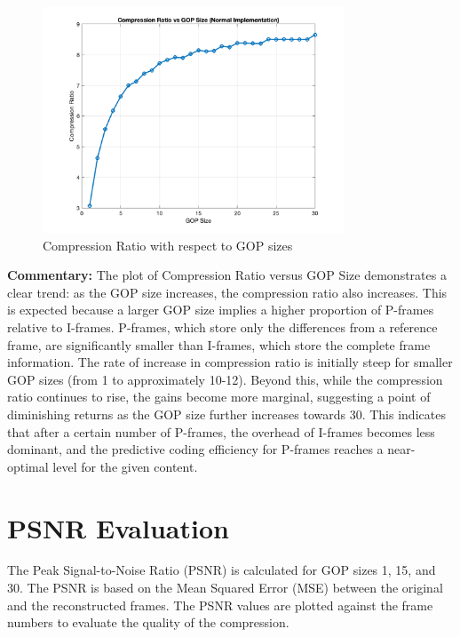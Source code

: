 \documentclass{article}
\begin{document}
\begin{figure}[h]
    \centering
    \includegraphics[width=0.8\textwidth]{compression_ratio_plot.png}
    \caption{Compression Ratio with respect to GOP sizes}
    \label{fig:compression_ratio}
\end{figure}

\noindent \textbf{Commentary:} The plot of Compression Ratio versus GOP Size demonstrates a clear trend: as the GOP size increases, the compression ratio also increases. This is expected because a larger GOP size implies a higher proportion of P-frames relative to I-frames. P-frames, which store only the differences from a reference frame, are significantly smaller than I-frames, which store the complete frame information. The rate of increase in compression ratio is initially steep for smaller GOP sizes (from 1 to approximately 10-12). Beyond this, while the compression ratio continues to rise, the gains become more marginal, suggesting a point of diminishing returns as the GOP size further increases towards 30. This indicates that after a certain number of P-frames, the overhead of I-frames becomes less dominant, and the predictive coding efficiency for P-frames reaches a near-optimal level for the given content.

\section{PSNR Evaluation}
The Peak Signal-to-Noise Ratio (PSNR) is calculated for GOP sizes 1, 15, and 30. The PSNR is based on the Mean Squared Error (MSE) between the original and the reconstructed frames. The PSNR values are plotted against the frame numbers to evaluate the quality of the compression.
\end{document}
